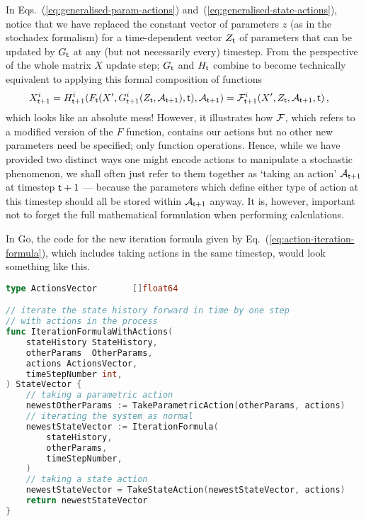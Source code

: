In Eqs.~(\ref{eq:generalised-param-actions}) and~(\ref{eq:generalised-state-actions}), notice that we have replaced the constant vector of parameters $z$ (as in the stochadex formalism) for a time-dependent vector $Z_{{\sf t}}$ of parameters that can be updated by $G_{\sf t}$ at any (but not necessarily every) timestep. From the perspective of the whole matrix $X$ update step; $G_{\sf t}$ and $H_{\sf t}$ combine to become technically equivalent to applying this formal composition of functions
\begin{align}
X^i_{{\sf t}+1} &= H^i_{{\sf t}+1}(F_{\sf t}(X', G_{{\sf t}+1}^i(Z_{{\sf t}}, {\cal A}_{{\sf t}+1}), {\sf t}), {\cal A}_{{\sf t}+1}) = {\cal F}^i_{{\sf t}+1}(X', Z_{{\sf t}}, {\cal A}_{{\sf t}+1}, {\sf t}) \label{eq:action-iteration-formula}\,,
\end{align}
which looks like an absolute mess! However, it illustrates how ${\cal F}$, which refers to a modified version of the $F$ function, contains our actions but no other new parameters need be specified; only function operations. Hence, while we have provided two distinct ways one might encode actions to manipulate a stochastic phenomenon, we shall often just refer to them together as `taking an action' ${\cal A}_{{\sf t}+1}$ at timestep ${\sf t}+1$ --- because the parameters which define either type of action at this timestep should all be stored within ${\cal A}_{{\sf t}+1}$ anyway. It is, however, important not to forget the full mathematical formulation when performing calculations. 

In Go, the code for the new iteration formula given by Eq.~(\ref{eq:action-iteration-formula}), which includes taking actions in the same timestep, would look something like this.

\begin{lstlisting}[language=Go]
type ActionsVector       []float64

// iterate the state history forward in time by one step
// with actions in the process
func IterationFormulaWithActions(
    stateHistory StateHistory, 
    otherParams  OtherParams,
    actions ActionsVector,
    timeStepNumber int,
) StateVector {
    // taking a parametric action
    newestOtherParams := TakeParametricAction(otherParams, actions)
    // iterating the system as normal
    newestStateVector := IterationFormula(
        stateHistory, 
        otherParams,
        timeStepNumber,
    )
    // taking a state action
    newestStateVector = TakeStateAction(newestStateVector, actions)
    return newestStateVector
}
\end{lstlisting}